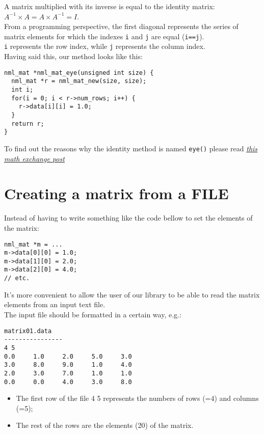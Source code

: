 A matrix multiplied with its inverse is equal to the identity matrix:\quad  $A^{-1} \times A = A \times A^{-1} = I$.
\\

From a programming perspective, the first diagonal represents the series of matrix elements for which the indexes {\tt i} and {\tt j} are equal ({\tt i==j}).
\\

{\tt i} represents the row index, while {\tt j} represents the column index.
\\

Having said this, our method looks like this:

\begin{verbatim}
nml_mat *nml_mat_eye(unsigned int size) {
  nml_mat *r = nml_mat_new(size, size);
  int i;
  for(i = 0; i < r->num_rows; i++) {
    r->data[i][i] = 1.0;
  }
  return r;
}
\end{verbatim}

To find out the reasons why the identity method is named {\tt eye()} please read \href{https://math.stackexchange.com/questions/3028394/what-is-the-motivation-behind-naming-identity-matrix-as-eye/3028999}{\underline{\itshape this math exchange post}}

\section{Creating a matrix from a FILE}

Instead of having to write something like the code bellow to set the elements of the matrix:

\begin{verbatim}
nml_mat *m = ...
m->data[0][0] = 1.0;
m->data[1][0] = 2.0;
m->data[2][0] = 4.0;
// etc. 
\end{verbatim}

It’s more convenient to allow the user of our library to be able to read the matrix elements from an input text file.
\\
The input file should be formatted in a certain way, e.g.:

\begin{verbatim}
matrix01.data
----------------
4 5
0.0     1.0     2.0     5.0     3.0
3.0     8.0     9.0     1.0     4.0
2.0     3.0     7.0     1.0     1.0
0.0     0.0     4.0     3.0     8.0
\end{verbatim}

\begin{itemize}
\item The first row of the file 4 5 represents the numbers of rows (=4) and columns (=5);
\item The rest of the rows are the elements (20) of the matrix.
\end{itemize}

